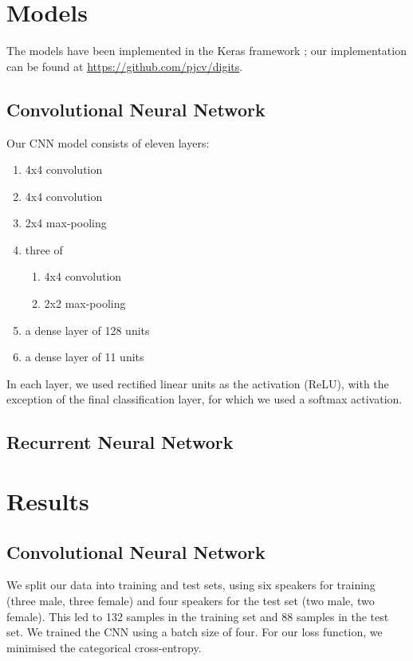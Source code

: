\section{Models} \label{sec:models}

The models have been implemented in the Keras framework \cite{keras}; our implementation can be found at \url{https://github.com/pjcv/digits}.

\subsection{Convolutional Neural Network}
Our CNN model consists of eleven layers: 

\begin{enumerate}
\item 4x4 convolution
\item 4x4 convolution
\item 2x4 max-pooling
\item three of
\begin{enumerate}
\item 4x4 convolution
\item 2x2 max-pooling
\end{enumerate}
\item a dense layer of 128 units
\item a dense layer of 11 units
\end{enumerate}

In each layer, we used rectified linear units as the activation (ReLU), with the exception of the final classification layer, for which we used a softmax activation.
 
\subsection{Recurrent Neural Network}



\section{Results} \label{sec:results}
\subsection{Convolutional Neural Network}
We split our data into training and test sets, using six speakers for training (three male, three female) and four speakers for the test set (two male, two female). This led to 132 samples in the training set and 88 samples in the test set. We trained the CNN using a batch size of four. For our loss function, we minimised the categorical cross-entropy.

